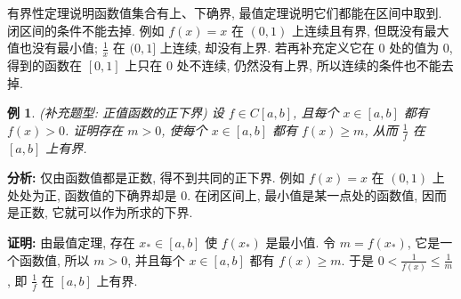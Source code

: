 \documentclass[UTF8,openany]{ctexbook}
\theoremstyle{chinesetextbook}
\newtheorem{example}{例}[section]
\newenvironment{cnproof}{\par\indent\textbf{证明:} \ignorespaces}{\par}
\begin{document}
有界性定理说明函数值集合有上、下确界, 最值定理说明它们都能在区间中取到. 闭区间的条件不能去掉. 例如 $f(x)=x$ 在 $(0,1)$ 上连续且有界, 但既没有最大值也没有最小值; $\displaystyle\frac1x$ 在 $(0,1]$ 上连续, 却没有上界. 若再补充定义它在 $0$ 处的值为 $0$, 得到的函数在 $[0,1]$ 上只在 $0$ 处不连续, 仍然没有上界, 所以连续的条件也不能去掉.
\begin{example}
\textnormal{(补充题型: 正值函数的正下界)} 设 $f\in C[a,b]$, 且每个 $x\in[a,b]$ 都有 $f(x)>0$. 证明存在 $m>0$, 使每个 $x\in[a,b]$ 都有 $f(x)\ge m$, 从而 $\displaystyle\frac1f$ 在 $[a,b]$ 上有界.
\end{example}
\par\indent\textbf{分析:} 仅由函数值都是正数, 得不到共同的正下界. 例如 $f(x)=x$ 在 $(0,1)$ 上处处为正, 函数值的下确界却是 $0$. 在闭区间上, 最小值是某一点处的函数值, 因而是正数, 它就可以作为所求的下界.
\begin{cnproof}
由最值定理, 存在 $x_*\in[a,b]$ 使 $f(x_*)$ 是最小值. 令 $m=f(x_*)$, 它是一个函数值, 所以 $m>0$, 并且每个 $x\in[a,b]$ 都有 $f(x)\ge m$. 于是 $\displaystyle0<\frac1{f(x)}\le\frac1m$, 即 $\displaystyle\frac1f$ 在 $[a,b]$ 上有界.
\end{cnproof}
\end{document}
